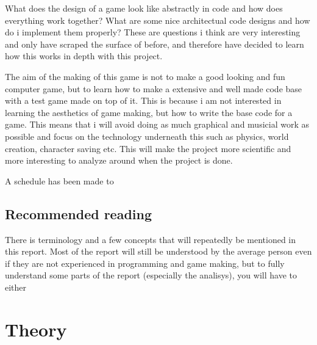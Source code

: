 \documentclass[a4paper,12pt]{article}
\begin{document}
What does the design of a game look like abstractly in code and how does everything work together?
What are some nice architectual code designs and how do i implement them properly?
These are questions i think are very interesting and only have scraped the surface of before, and therefore have decided to learn how this works in depth with this project.

The aim of the making of this game is not to make a good looking and fun computer game, but to learn how to make a extensive and well made code base with a test game made on top of it.
This is because i am not interested in learning the aesthetics of game making, but how to write the base code for a game.
This means that i will avoid doing as much graphical and musicial work as possible and focus on the technology underneath this such as physics, world creation, character saving etc.
This will make the project more scientific and more interesting to analyze around when the project is done.

A schedule has been made to 


\subsection{Recommended reading}
There is terminology and a few concepts that will repeatedly be mentioned in this report.
Most of the report will still be understood by the average person even if they are not experienced in programming and game making, but to fully understand some parts of the report (especially the analisys), you will have to either 


\clearpage

\section{Theory}
\end{document}
